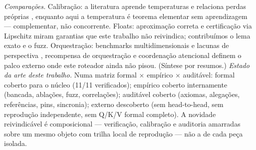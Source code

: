 \textit{Comparações.} Calibração: a literatura aprende temperaturas e relaciona perdas próprias \cite{komisarenko2024,xuan2025,xie2024}, enquanto aqui a temperatura é teorema elementar sem aprendizagem --- complementar, não concorrente. Floats: aproximação correta e certificação via Lipschitz \cite{bagnara2019,murray2026} miram garantias que este trabalho não reivindica; contribuímos o lema exato e o fuzz. Orquestração: benchmarks multidimensionais e lacunas de perspectiva \cite{agentbench2023,perspectivegap2026}, recompensa de orquestração \cite{orchrm2026} e coordenação atencional \cite{orchestrator2025} definem o palco externo onde este roteador ainda não pisou. (Síntese por resumos.)
\textit{Estado da arte deste trabalho.} Numa matriz formal $\times$ empírico $\times$ auditável: formal coberto para o núcleo (11/11 verificados); empírico coberto internamente (bancada, ablações, fuzz, correlações); auditável coberto (axiomas, alegações, referências, pins, sincronia); externo descoberto (sem head-to-head, sem reprodução independente, sem Q/K/V formal completo). A novidade reivindicável é composicional --- verificação, calibração e auditoria amarradas sobre um mesmo objeto com trilha local de reprodução --- não a de cada peça isolada.
